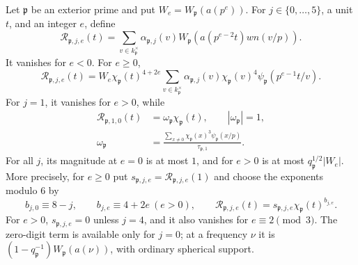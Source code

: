 \begin{lemma}\label{lem:reflection-local-Weyl}
Let \(\mathfrak p\) be an exterior prime and put
\(W_e=W_{\mathfrak p}(a(p^e))\).  For \(j\in\{0,\ldots,5\}\), a unit \(t\),
and an integer \(e\), define
\[
 \mathcal R_{\mathfrak p,j,e}(t)
 =\sum_{v\in k_{\mathfrak p}^{\times}}\alpha_{\mathfrak p,j}(v)
       W_{\mathfrak p}(a(p^{e-2}t)w n(v/p)).
\]
It vanishes for \(e<0\).  For \(e\ge0\),
\begin{equation}\label{eq:reflection-local-formula}
 \mathcal R_{\mathfrak p,j,e}(t)
 =W_e\chi_{\mathfrak p}(t)^{4+2e}
   \sum_{v\in k_{\mathfrak p}^{\times}}
     \alpha_{\mathfrak p,j}(v)\chi_{\mathfrak p}(v)^4
     \psi_{\mathfrak p}(p^{e-1}t/v).
\end{equation}
For \(j=1\), it vanishes for \(e>0\), while
\begin{equation}\label{eq:reflection-valuation-one}
\begin{split}
 \mathcal R_{\mathfrak p,1,0}(t)
      &=\omega_{\mathfrak p}\chi_{\mathfrak p}(t),
       \qquad |\omega_{\mathfrak p}|=1,\\
 \omega_{\mathfrak p}
 &=\frac{\sum_{x\ne0}\chi_{\mathfrak p}(x)^3\psi_{\mathfrak p}(x/p)}
        {\tau_{\mathfrak p,1}}.
\end{split}
\end{equation}
For all \(j\), its magnitude at \(e=0\) is at most \(1\), and for \(e>0\)
is at most \(q_{\mathfrak p}^{1/2}|W_e|\).  More precisely, for \(e\ge0\)
put \(s_{\mathfrak p,j,e}=\mathcal R_{\mathfrak p,j,e}(1)\) and choose
the exponents modulo \(6\) by
\begin{equation}\label{eq:reflection-local-monomial}
 b_{j,0}\equiv8-j,\qquad b_{j,e}\equiv4+2e\ (e>0),\qquad
 \mathcal R_{\mathfrak p,j,e}(t)
       =s_{\mathfrak p,j,e}\chi_{\mathfrak p}(t)^{b_{j,e}}.
\end{equation}
For \(e>0\), \(s_{\mathfrak p,j,e}=0\) unless \(j=4\), and it also
vanishes for \(e\equiv2\pmod3\).  The zero-digit term is available only
for \(j=0\); at a frequency \(\nu\) it is
\((1-q_{\mathfrak p}^{-1})W_{\mathfrak p}(a(\nu))\), with ordinary
spherical support.
\end{lemma}

